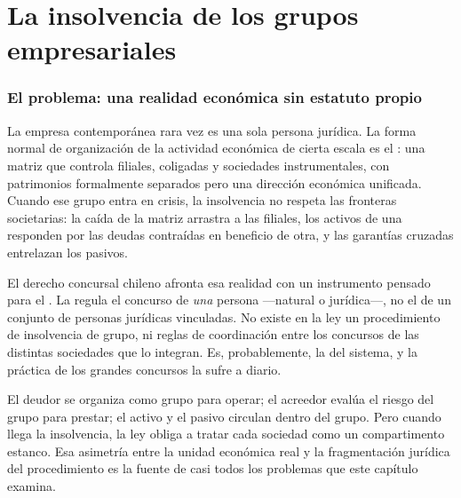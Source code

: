 \chapter{La insolvencia de los grupos empresariales}
\label{cap:grupos}


\bloqueTeorico

\subsection{El problema: una realidad económica sin estatuto propio}

La empresa contemporánea rara vez es una sola persona jurídica. La forma normal de organización de
la actividad económica de cierta escala es el : una matriz que controla
filiales, coligadas y sociedades instrumentales, con patrimonios formalmente separados pero una
dirección económica unificada. Cuando ese grupo entra en crisis, la insolvencia no respeta las
fronteras societarias: la caída de la matriz arrastra a las filiales, los activos de una responden
por las deudas contraídas en beneficio de otra, y las garantías cruzadas entrelazan los pasivos.

El derecho concursal chileno afronta esa realidad con un instrumento pensado para el
. La \LIR{} \citeyearpar{ley-20720} regula el concurso de \emph{una}
persona ---natural o jurídica---, no el de un conjunto de personas jurídicas vinculadas. No existe
en la ley un procedimiento de insolvencia de grupo, ni reglas de coordinación entre los concursos
de las distintas sociedades que lo integran. Es, probablemente, la  del sistema, y la práctica de los grandes concursos la sufre a diario.

\begin{foco}
El deudor se organiza como grupo para operar; el acreedor evalúa el riesgo del grupo para prestar;
el activo y el pasivo circulan dentro del grupo. Pero cuando llega la insolvencia, la ley obliga a
tratar cada sociedad como un compartimento estanco. Esa asimetría entre la unidad económica real y
la fragmentación jurídica del procedimiento es la fuente de casi todos los problemas que este
capítulo examina.
\end{foco}

